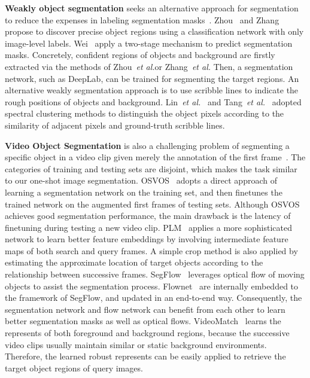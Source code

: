 \documentclass[journal]{IEEEtran}
\newcommand{\etal}{\emph{et al.}}
\begin{document}
\textbf{Weakly object segmentation} seeks an alternative approach for segmentation to reduce the expenses in labeling segmentation masks~\cite{wang2018weakly,wang2017instance,liu2019weakly,qian2019weakly,hou2018self,jiang2019integral}.
Zhou~\cite{zhou2015cnnlocalization} and Zhang~\cite{zhang2018adversarial,zhang2018self} propose to discover precise object regions using a classification network with only image-level labels.
Wei~\cite{wei2018revisiting,wei2017object} apply a two-stage mechanism to predict segmentation masks.
Concretely, confident regions of objects and background are firstly extracted via the methods of Zhou~\etal or Zhang~\etal
Then, a segmentation network, such as DeepLab, can be trained for segmenting the target regions. 
An alternative weakly segmentation approach is to use scribble lines to indicate the rough positions of objects and background.
Lin~\etal~\cite{lin2016scribblesup} and Tang~\etal~\cite{tang2018normalized} adopted spectral clustering methods to distinguish the object pixels according to the similarity of adjacent pixels and ground-truth scribble lines. 

\textbf{Video Object Segmentation} is also a challenging problem of segmenting a specific object in a video clip given merely the annotation of the first frame~\cite{davis2017}. The categories of training and testing sets are disjoint, which makes the task similar to our one-shot image segmentation.
OSVOS~\cite{caelles2017one} adopts a direct approach of learning a segmentation network on the training set, and then finetunes the trained network on the augmented first frames of testing sets. 
Although OSVOS achieves good segmentation performance, the main drawback is the latency of finetuning during testing a new video clip. 
PLM~\cite{shin2017pixel} applies a more sophisticated network to learn better feature embeddings by involving intermediate feature maps of both search and query frames.
A simple crop method is also applied by estimating the approximate location of target objects according to the relationship between successive frames. 
SegFlow~\cite{cheng2017segflow} leverages optical flow of moving objects to assist the segmentation process.
Flownet~\cite{dosovitskiy2015flownet} are internally embedded to the framework of SegFlow, and updated in an end-to-end way.
Consequently, the segmentation network and flow network can benefit from each other to learn better segmentation masks as well as optical flows.
VideoMatch~\cite{hu2018videomatch} learns the represents of both foreground and background regions, because the successive video clips usually maintain similar or static background environments. 
Therefore, the learned robust represents can be easily applied to retrieve the target object regions of query images.
\end{document}
